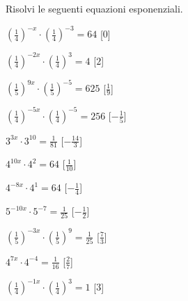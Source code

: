 \begin{esercizio}\label{ese:}
 Risolvi le seguenti equazioni esponenziali.
 \begin{enumeratea}
  \item  \(\left(\frac{1}{4}\right)^{-x} \cdot \left(\frac{1}{4}\right)^{-3} = 
64\)
   \hfill [\(0\)]
  \item  \(\left(\frac{1}{4}\right)^{-2x} \cdot \left(\frac{1}{4}\right)^{3} = 
4\)
   \hfill [\(2\)]
  \item  \(\left(\frac{1}{5}\right)^{9x} \cdot \left(\frac{1}{5}\right)^{-5} = 
625\)
   \hfill [\(\frac{1}{9}\)]
  \item  \(\left(\frac{1}{4}\right)^{-5x} \cdot \left(\frac{1}{4}\right)^{-5} = 
256\)
   \hfill [\(-\frac{1}{5}\)]
  \item  \(3^{3x} \cdot 3^{10} = \frac{1}{81}\)
   \hfill [\(-\frac{14}{3}\)]
  \item  \(4^{10x} \cdot 4^{2} = 64\)
   \hfill [\(\frac{1}{10}\)]
  \item  \(4^{-8x} \cdot 4^{1} = 64\)
   \hfill [\(-\frac{1}{4}\)]
  \item  \(5^{-10x} \cdot 5^{-7} = \frac{1}{25}\)
   \hfill [\(-\frac{1}{2}\)]
  \item  \(\left(\frac{1}{5}\right)^{-3x} \cdot \left(\frac{1}{5}\right)^{9} = 
\frac{1}{25}\)
   \hfill [\(\frac{7}{3}\)]
  \item  \(4^{7x} \cdot 4^{-4} = \frac{1}{16}\)
   \hfill [\(\frac{2}{7}\)]
  \item  \(\left(\frac{1}{4}\right)^{-1x} \cdot \left(\frac{1}{4}\right)^{3} = 
1\)
   \hfill [\(3\)]
 \end{enumeratea}
\end{esercizio}



